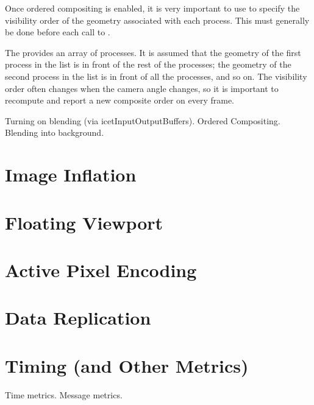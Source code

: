 Once ordered compositing is enabled, it is very important to use
 to specify the visibility order of the geometry
associated with each process.  This must generally be done before each call
to .
\begin{Table}{1}
  \textC{(} 
   \textC{);}
\end{Table}
The  provides an array of processes.  It is
assumed that the geometry of the first process in the list is in front of
the rest of the processes; the geometry of the second process in the list
is in front of all the processes, and so on.  The visibility order often
changes when the camera angle changes, so it is important to recompute and
report a new composite order on every frame.



Turning on blending (via icetInputOutputBuffers).
Ordered Compositing.
Blending into background.



\section{Image Inflation}
\label{sec:Customizing_Compositing:Image_Inflation}

\section{Floating Viewport}
\label{sec:Customizing_Compositing:Floating_Viewport}

\section{Active Pixel Encoding}
\label{sec:Customizing_Compositing:Active_Pixel_Encoding}

\section{Data Replication}
\label{sec:Customizing_Compositing:Data_Replication}

\section{Timing (and Other Metrics)}
\label{sec:Customizing_Compositing:Timing}

Time metrics.
Message metrics.

